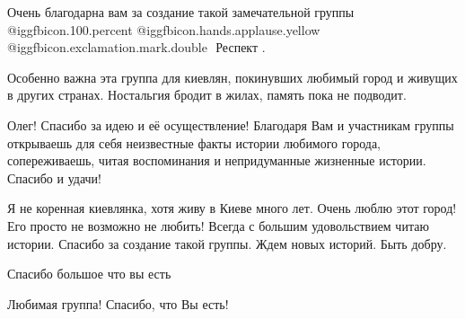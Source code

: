 \begin{itemize}
Очень благодарна вам за создание такой замечательной группы
@igg{fbicon.100.percent}  @igg{fbicon.hands.applause.yellow}
@igg{fbicon.exclamation.mark.double} ️  Респект .


Особенно важна эта группа для киевлян, покинувших любимый город и живущих в
других странах. Ностальгия бродит в жилах, память пока не подводит.


Олег! Спасибо за идею и её осуществление! Благодаря Вам и участникам группы
открываешь для себя неизвестные факты истории любимого города, сопереживаешь,
читая воспоминания и непридуманные жизненные истории. Спасибо и удачи!


Я не коренная киевлянка, хотя живу в Киеве много лет. Очень люблю этот город! Его
просто не возможно не любить! Всегда с большим удовольствием читаю
истории. Спасибо за создание такой группы. Ждем новых историй. Быть добру.

Спасибо большое что вы есть

Любимая группа! Спасибо, что Вы есть!

\end{itemize} %
